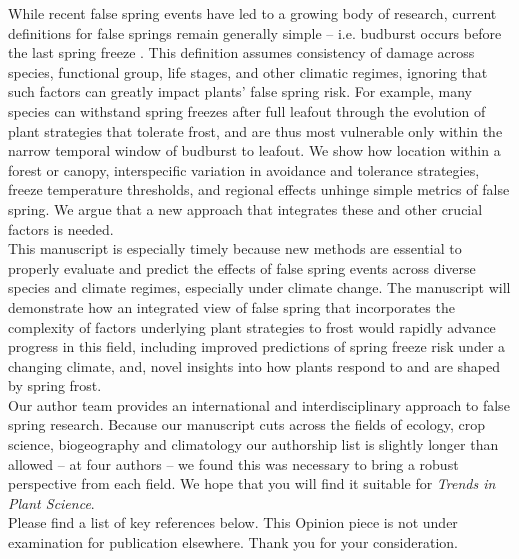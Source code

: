 \documentclass[11pt,a4paper]{article}\usepackage[]{graphicx}\usepackage[]{color}
\begin{document}
\noindent While recent false spring events have led to a growing body of research, current definitions for false springs remain generally simple -- i.e. budburst occurs before the last spring freeze \citep{Gu2008}. This definition assumes consistency of damage across species, functional group, life stages, and other climatic regimes, ignoring that such factors can greatly impact plants' false spring risk. For example, many species can withstand spring freezes after full leafout through the evolution of plant strategies that tolerate frost, and are thus most vulnerable only within the narrow temporal window of budburst to leafout. We show how location within a forest or canopy, interspecific variation in avoidance and tolerance strategies, freeze temperature thresholds, and regional effects unhinge simple metrics of false spring. We argue that a new approach that integrates these and other crucial factors is needed.  \\

\noindent This manuscript is especially timely because new methods are essential to properly evaluate and predict the effects of false spring events across diverse species and climate regimes, especially under climate change. The manuscript will demonstrate how an integrated view of false spring that incorporates the complexity of factors underlying plant strategies to frost would rapidly advance progress in this field, including improved predictions of spring freeze risk under a changing climate, and, novel insights into how plants respond to and are shaped by spring frost. \\

\noindent Our author team provides an international and interdisciplinary approach to false spring research. Because our manuscript cuts across the fields of ecology, crop science, biogeography and climatology our authorship list is slightly longer than allowed -- at four authors -- we found this was necessary to bring a robust perspective from each field. We hope that you will find it suitable for \textit{Trends in Plant Science}. \\

\noindent Please find a list of key references below. This Opinion piece is not under examination for publication elsewhere. Thank you for your consideration. \\
\end{document}

